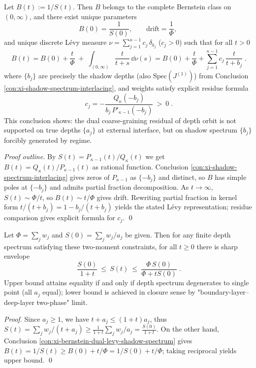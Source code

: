 \begin{proposition}\label{con:xi-bernstein-dual-levy-shadow-spectrum}
Let \(B(t):=1/S(t)\).
Then \(B\) belongs to the complete Bernstein class on \((0,\infty)\), and there exist unique parameters
\[
B(0)=\frac{1}{S(0)},
\qquad
\mathrm{drift}=\frac{1}{\Phi},
\]
and unique discrete Lévy measure
\(
\nu=\sum_{j=1}^{\kappa-1} c_j\,\delta_{b_j}
\)
(\(c_j>0\)) such that for all \(t>0\)
\[
\boxed{\;
B(t)=B(0)+\frac{t}{\Phi}
\;+\;\int_{(0,\infty)}\frac{t}{t+s}\,\dd\nu(s)
=B(0)+\frac{t}{\Phi}+\sum_{j=1}^{\kappa-1}c_j\,\frac{t}{t+b_j}\; }.
\]
where \(\{b_j\}\) are precisely the shadow depths (also \(\mathrm{Spec}(J^{(1)})\)) from Conclusion \ref{con:xi-shadow-spectrum-interlacing}, and weights satisfy explicit residue formula
\[
\boxed{\;
c_j=-\frac{Q_{\kappa}(-b_j)}{b_j\,P'_{\kappa-1}(-b_j)}\ >\ 0\; }.
\]
This conclusion shows: the dual coarse-graining residual of depth orbit is not supported on true depths \(\{a_j\}\) at external interface, but on shadow spectrum \(\{b_j\}\) forcibly generated by regime.
\end{proposition}
\begin{proof}[Proof outline]
By \(S(t)=P_{\kappa-1}(t)/Q_{\kappa}(t)\) we get \(B(t)=Q_{\kappa}(t)/P_{\kappa-1}(t)\) as rational function.
Conclusion \ref{con:xi-shadow-spectrum-interlacing} gives zeros of \(P_{\kappa-1}\) as \(\{-b_j\}\) and distinct, so \(B\) has simple poles at \(\{-b_j\}\) and admits partial fraction decomposition.
As \(t\to\infty\), \(S(t)\sim \Phi/t\), so \(B(t)\sim t/\Phi\) gives drift.
Rewriting partial fraction in kernel form \(t/(t+b_j)=1-b_j/(t+b_j)\) yields the stated Lévy representation; residue comparison gives explicit formula for \(c_j\). \qed
\end{proof}

\begin{proposition}\label{con:xi-two-moment-envelope}
Let \(\Phi=\sum_j w_j\) and \(S(0)=\sum_j w_j/a_j\) be given.
Then for any finite depth spectrum satisfying these two-moment constraints, for all \(t\ge 0\) there is sharp envelope
\[
\boxed{\;
\frac{S(0)}{1+t}\ \le\ S(t)\ \le\ \frac{\Phi\,S(0)}{\Phi+tS(0)}\; }.
\]
Upper bound attains equality if and only if depth spectrum degenerates to single point (all \(a_j\) equal); lower bound is achieved in closure sense by "boundary-layer--deep-layer two-phase" limit.
\end{proposition}
\begin{proof}
Since \(a_j\ge 1\), we have \(t+a_j\le (1+t)a_j\), thus
\(
S(t)=\sum_j w_j/(t+a_j)\ge \frac{1}{1+t}\sum_j w_j/a_j=\frac{S(0)}{1+t}
\).
On the other hand, Conclusion \ref{con:xi-bernstein-dual-levy-shadow-spectrum} gives
\(
B(t)=1/S(t)\ge B(0)+t/\Phi=1/S(0)+t/\Phi
\);
taking reciprocal yields upper bound. \qed
\end{proof}

